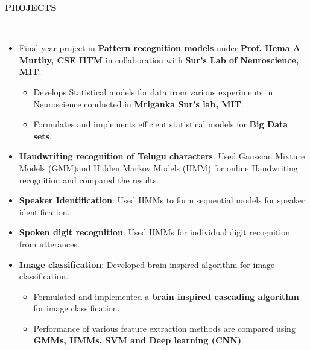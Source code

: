 \documentclass[a4paper,10pt]{article}
\newcommand{\lsep}{-0.5cm}
\newcommand{\resheading}[1]{{\small \colorbox{mygrey}{\begin{minipage}{0.975\textwidth}{\textbf{#1 \vphantom{p\^{E}}}}\end{minipage}}}}
\begin{document}
\resheading{\textbf{PROJECTS} }\\[\lsep]
    \begin{itemize}
        \item Final year project in \textbf{Pattern recognition models} under \textbf{Prof. Hema A Murthy, CSE IITM} in collaboration with \textbf{Sur's Lab of Neuroscience, MIT}.
        \begin{itemize}
            \vspace{-5pt}
            \item Develops Statistical models for data from various experiments in Neuroscience conducted in \textbf{Mriganka Sur's lab, MIT}.
            \item Formulates and implements efficient statistical models for \textbf{Big Data sets}.
        \end{itemize}
        \vspace{-5pt}
        \item \textbf{Handwriting recognition of Telugu characters}: Used Gaussian Mixture Models (GMM)and Hidden Markov Models (HMM) for online Handwriting recognition and compared the results.
        \vspace{-5pt}
        \item \textbf{Speaker Identification}: Used HMMs to form sequential models for speaker identification.
        \vspace{-5pt}
        \item \textbf{Spoken digit recognition}: Used HMMs for individual digit recognition from utterances. 
        \vspace{-5pt}
        \item \textbf{Image classification}: Developed brain inspired algorithm for image classification.
        \begin{itemize}
        \vspace{-5pt}
            \item Formulated and implemented a \textbf{brain inspired cascading algorithm} for image classification.
            \item Performance of various feature extraction methods are compared using \textbf{GMMs, HMMs, SVM and Deep learning (CNN)}.            
        \end{itemize}


\end{itemize}
\end{document}
